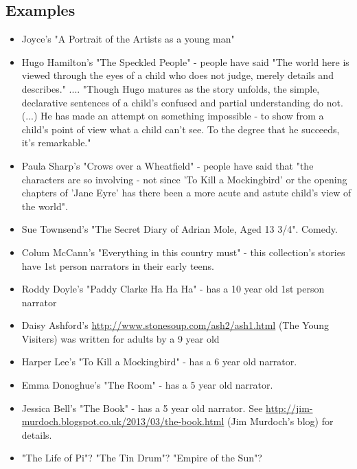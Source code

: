 \documentclass[11pt]{article}
\begin{document}
\subsection*{Examples}
\begin{itemize}
\item  Joyce's "A Portrait of the Artists as a young man"
\item  Hugo Hamilton's "The Speckled People" - people have said "The world here is viewed through the eyes of a child who does not judge, merely details and describes." .... "Though Hugo matures as the story unfolds, the simple, declarative sentences of a child's confused and partial understanding do not. (...) He has made an attempt on something impossible - to show from a child's point of view what a child can't see. To the degree that he succeeds, it's remarkable."
\item Paula Sharp's "Crows over a Wheatfield" - people have said that "the characters are so involving - not since 'To Kill a Mockingbird' or the opening chapters of 'Jane Eyre' has there been a more acute and astute child's view of the world".

\item Sue Townsend's "The Secret Diary of Adrian Mole, Aged 13 3/4". Comedy.
\item Colum McCann's "Everything in this country must" - this
      collection's  stories have 1st person narrators in their early teens.
\item Roddy Doyle's "Paddy Clarke Ha Ha Ha" - has a 10 year old 1st person narrator
\item Daisy Ashford's \url{http://www.stonesoup.com/ash2/ash1.html} (The Young
    Visiters) was written for adults by a 9 year old
\item Harper Lee's "To Kill a Mockingbird" - has a 6 year old narrator.
\item Emma Donoghue's "The Room" - has a 5 year old narrator.
\item  Jessica Bell’s "The Book" - has a 5 year old narrator. See \url{http://jim-murdoch.blogspot.co.uk/2013/03/the-book.html} (Jim Murdoch's blog) for details.
\item "The Life of Pi"? "The Tin Drum"? "Empire of the Sun"?
\end{itemize}
\end{document}
